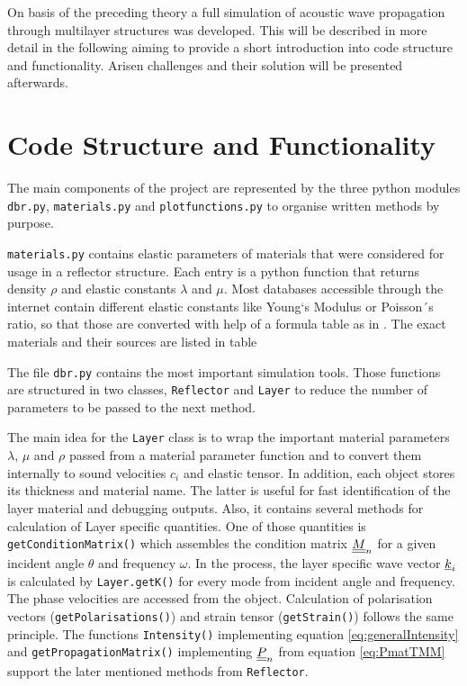 On basis of the preceding theory a full simulation of acoustic wave propagation
through multilayer structures was developed. This will be
described in more detail in the following aiming to provide a short
introduction into code structure and functionality. Arisen challenges and their
solution will be presented afterwards.

\section{Code Structure and Functionality}
The main components of the project are represented by the three python modules
\texttt{dbr.py}, \texttt{materials.py} and \texttt{plotfunctions.py} to
organise written methods by purpose.

\texttt{materials.py} contains elastic parameters of materials that were
considered for usage in a reflector structure. Each entry is a python function
that returns density $\rho$ and elastic constants $\lambda$ and $\mu$. Most
databases accessible through the internet contain different elastic constants
like Young`s Modulus or Poisson´s ratio, so that those are converted with help
of a formula table as in \cite[30]{kundu2012ultrasonic} . The exact materials and their sources are listed in table

The file \texttt{dbr.py} contains the most important simulation tools. Those
functions are structured in two classes, \texttt{Reflector} and \texttt{Layer}
to reduce the number of parameters to be passed to the next method.

The main idea for the \texttt{Layer} class is to wrap the important material
parameters $\lambda$, $\mu$ and $\rho$ passed from a material parameter
function and to convert them internally to sound velocities $c_i$ and elastic
tensor. In addition, each object stores its thickness and material name. The
latter is useful for fast identification of the layer material and debugging
outputs.
Also, it contains several methods for calculation of Layer specific
quantities. One of those quantities is \texttt{getConditionMatrix()} which
assembles the condition matrix $\underline{\underline{M}}_n$ for a given incident angle
$\theta$ and frequency $\omega$. In the process, the layer specific wave vector
$\underline{k}_i$ is calculated by \texttt{Layer.getK()} for every mode from
incident angle and frequency. The phase velocities are accessed from the
object. Calculation of polarisation vectors (\texttt{getPolarisations()}) and
strain tensor (\texttt{getStrain()}) follows the same principle. The functions
\texttt{Intensity()} implementing equation \ref{eq:generalIntensity} and
\texttt{getPropagationMatrix()} implementing $\underline{\underline{P}}_n$ from equation
\ref{eq:PmatTMM} support the later mentioned methods from
\texttt{Reflector}.

